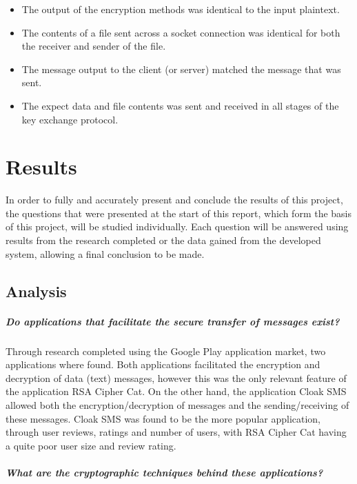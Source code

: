 \documentclass[a4paper,12pt]{report}
\begin{document}
\begin{itemize}
 \item The output of the encryption methods was identical to the input plaintext.
 \item The contents of a file sent across a socket connection was identical for both the receiver and sender of the file.
 \item The message output to the client (or server) matched the message that was sent.
 \item The expect data and file contents was sent and received in all stages of the key exchange protocol.
\end{itemize}

\chapter{Results}

In order to fully and accurately present and conclude the results of this project, the questions that were presented at the start of this report, which form the basis of this project, will be studied individually. Each question will be answered using results from the research completed or the data gained from the developed system, allowing a final conclusion to be made. 

\section{Analysis}

\paragraph{Do applications that facilitate the secure transfer of messages exist?}

Through research completed using the Google Play application market, two applications where found. Both applications facilitated the encryption and decryption of data (text) messages, however this was the only relevant feature of the application RSA Cipher Cat. On the other hand, the application Cloak SMS allowed both the encryption/decryption of messages and the sending/receiving of these messages. Cloak SMS was found to be the more popular application, through user reviews, ratings and number of users, with RSA Cipher Cat having a quite poor user size and review rating. 

\paragraph{What are the cryptographic techniques behind these applications?}
\end{document}
